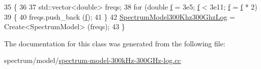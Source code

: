 \begin{DoxyCode}
35   \{
36 
37     std::vector<double> freqs;
38     \textcolor{keywordflow}{for} (\textcolor{keywordtype}{double} \hyperlink{buildings__pathloss_8m_aa52d3a6e3de5a80a97c12364caeaa125}{f} = 3e5; \hyperlink{buildings__pathloss_8m_aa52d3a6e3de5a80a97c12364caeaa125}{f} < 3e11; \hyperlink{buildings__pathloss_8m_aa52d3a6e3de5a80a97c12364caeaa125}{f} = \hyperlink{buildings__pathloss_8m_aa52d3a6e3de5a80a97c12364caeaa125}{f} * 2)
39       \{
40         freqs.push\_back (\hyperlink{buildings__pathloss_8m_aa52d3a6e3de5a80a97c12364caeaa125}{f});
41       \}
42     \hyperlink{namespacens3_a5441325fd5ee50b45387f44f4d0d7ce9}{SpectrumModel300Khz300GhzLog} = Create<SpectrumModel> (freqs);
43   \}
\end{DoxyCode}


The documentation for this class was generated from the following file\+:\begin{DoxyCompactItemize}
\item 
spectrum/model/\hyperlink{spectrum-model-300kHz-300GHz-log_8cc}{spectrum-\/model-\/300k\+Hz-\/300\+G\+Hz-\/log.\+cc}\end{DoxyCompactItemize}
